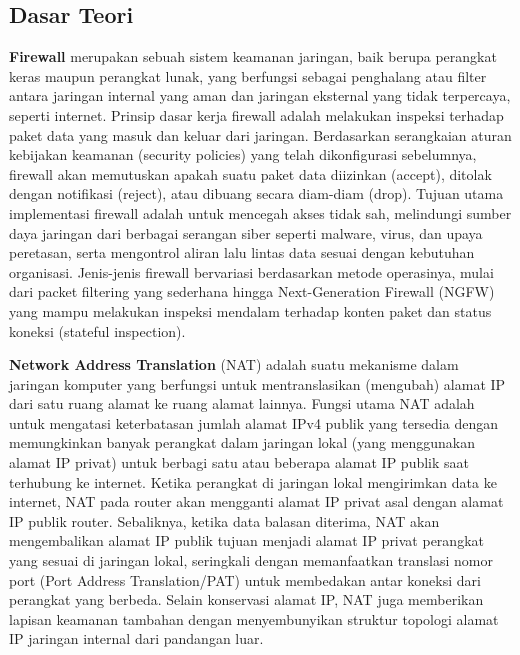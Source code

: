 \subsection{Dasar Teori}
\textbf{Firewall} merupakan sebuah sistem keamanan jaringan, baik berupa perangkat keras maupun perangkat lunak, yang berfungsi sebagai penghalang atau filter antara jaringan internal yang aman dan jaringan eksternal yang tidak terpercaya, seperti internet. Prinsip dasar kerja firewall adalah melakukan inspeksi terhadap paket data yang masuk dan keluar dari jaringan. Berdasarkan serangkaian aturan kebijakan keamanan (security policies) yang telah dikonfigurasi sebelumnya, firewall akan memutuskan apakah suatu paket data diizinkan (accept), ditolak dengan notifikasi (reject), atau dibuang secara diam-diam (drop). Tujuan utama implementasi firewall adalah untuk mencegah akses tidak sah, melindungi sumber daya jaringan dari berbagai serangan siber seperti malware, virus, dan upaya peretasan, serta mengontrol aliran lalu lintas data sesuai dengan kebutuhan organisasi. Jenis-jenis firewall bervariasi berdasarkan metode operasinya, mulai dari packet filtering yang sederhana hingga Next-Generation Firewall (NGFW) yang mampu melakukan inspeksi mendalam terhadap konten paket dan status koneksi (stateful inspection).

\textbf{Network Address Translation} (NAT) adalah suatu mekanisme dalam jaringan komputer yang berfungsi untuk mentranslasikan (mengubah) alamat IP dari satu ruang alamat ke ruang alamat lainnya. Fungsi utama NAT adalah untuk mengatasi keterbatasan jumlah alamat IPv4 publik yang tersedia dengan memungkinkan banyak perangkat dalam jaringan lokal (yang menggunakan alamat IP privat) untuk berbagi satu atau beberapa alamat IP publik saat terhubung ke internet. Ketika perangkat di jaringan lokal mengirimkan data ke internet, NAT pada router akan mengganti alamat IP privat asal dengan alamat IP publik router. Sebaliknya, ketika data balasan diterima, NAT akan mengembalikan alamat IP publik tujuan menjadi alamat IP privat perangkat yang sesuai di jaringan lokal, seringkali dengan memanfaatkan translasi nomor port (Port Address Translation/PAT) untuk membedakan antar koneksi dari perangkat yang berbeda. Selain konservasi alamat IP, NAT juga memberikan lapisan keamanan tambahan dengan menyembunyikan struktur topologi alamat IP jaringan internal dari pandangan luar.

